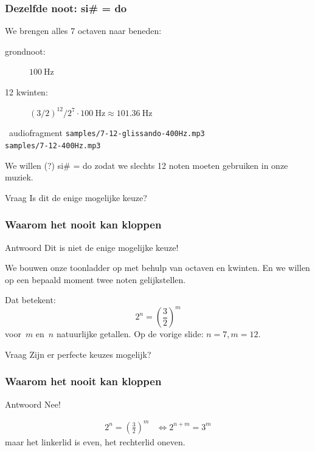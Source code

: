 \documentclass[compress, darktitle, framenumber, totalframenumber]{beamer}
\begin{document}
\begin{frame}
  \frametitle{Dezelfde noot: si\# = do}

  We brengen alles 7 octaven naar beneden:
  \begin{description}
    \item[grondnoot:] $\SI{100}{\hertz}$
    \item[12 kwinten:] $(3/2)^{12}/2^7\cdot\SI{100}{\hertz}\approx\SI{101.36}{\hertz}$
  \end{description}
  \pause
  \begin{block}{\twonotes\ audiofragment}
    \texttt{samples/7-12-glissando-400Hz.mp3} \\
    \texttt{samples/7-12-400Hz.mp3}
  \end{block}
  \pause
  We willen (?) si\# = do zodat we slechts 12 noten moeten gebruiken in onze muziek.

  \begin{alertblock}{Vraag}
    Is dit de enige mogelijke keuze?
  \end{alertblock}
\end{frame}

\begin{frame}
  \frametitle{Waarom het nooit kan kloppen}

  \begin{block}{Antwoord}
    Dit is niet de enige mogelijke keuze!
  \end{block}
  We bouwen onze toonladder op met behulp van octaven en kwinten. En we willen op een bepaald moment twee noten gelijkstellen.

  \pause
  Dat betekent:
  \begin{equation}
    2^n=\left( \frac{3}{2} \right)^m
  \end{equation}
  voor~$m$ en~$n$ natuurlijke getallen. Op de vorige slide: $n=7,m=12$.
  \pause
  \begin{alertblock}{Vraag}
    Zijn er perfecte keuzes mogelijk?
  \end{alertblock}
\end{frame}

\begin{frame}
  \frametitle{Waarom het nooit kan kloppen}

  \begin{block}{Antwoord}
    Nee!
  \end{block}
  \pause
  \begin{equation}
    \begin{aligned}
      2^n=\left( \frac{3}{2} \right)^m&\Longleftrightarrow 2^{n+m}=3^m
    \end{aligned}
  \end{equation}
  maar het linkerlid is even, het rechterlid oneven.
\end{frame}
\end{document}
